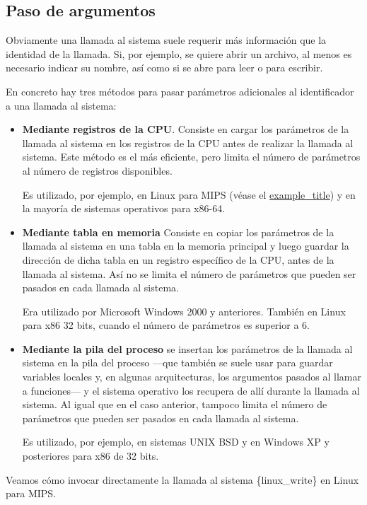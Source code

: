 \subsection{Paso de argumentos}\label{_paso_de_argumentos}

Obviamente una llamada al sistema suele requerir más información que la
identidad de la llamada. Si, por ejemplo, se quiere abrir un archivo, al
menos es necesario indicar su nombre, así como si se abre para leer o
para escribir.

En concreto hay tres métodos para pasar parámetros adicionales al
identificador a una llamada al sistema:

\begin{itemize}
\item
  \textbf{Mediante registros de la CPU}. Consiste en cargar los
  parámetros de la llamada al sistema en los registros de la CPU antes
  de realizar la llamada al sistema. Este método es el más eficiente,
  pero limita el número de parámetros al número de registros
  disponibles.

  Es utilizado, por ejemplo, en Linux para MIPS (véase el
  \hyperref[ejemplo-linux-mips-syscall]{example\_title}) y en la mayoría
  de sistemas operativos para x86-64.
\item
  \textbf{Mediante tabla en memoria} Consiste en copiar los parámetros
  de la llamada al sistema en una tabla en la memoria principal y luego
  guardar la dirección de dicha tabla en un registro específico de la
  CPU, antes de la llamada al sistema. Así no se limita el número de
  parámetros que pueden ser pasados en cada llamada al sistema.

  Era utilizado por Microsoft Windows 2000 y anteriores. También en
  Linux para x86 32 bits, cuando el número de parámetros es superior a
  6.
\item
  \textbf{Mediante la pila del proceso} se insertan los parámetros de la
  llamada al sistema en la pila del proceso ---que también se suele usar
  para guardar variables locales y, en algunas arquitecturas, los
  argumentos pasados al llamar a funciones--- y el sistema operativo los
  recupera de allí durante la llamada al sistema. Al igual que en el
  caso anterior, tampoco limita el número de parámetros que pueden ser
  pasados en cada llamada al sistema.

  Es utilizado, por ejemplo, en sistemas UNIX BSD y en Windows XP y
  posteriores para x86 de 32 bits.
\end{itemize}

Veamos cómo invocar directamente la llamada al sistema \{linux\_write\}
en Linux para MIPS.

